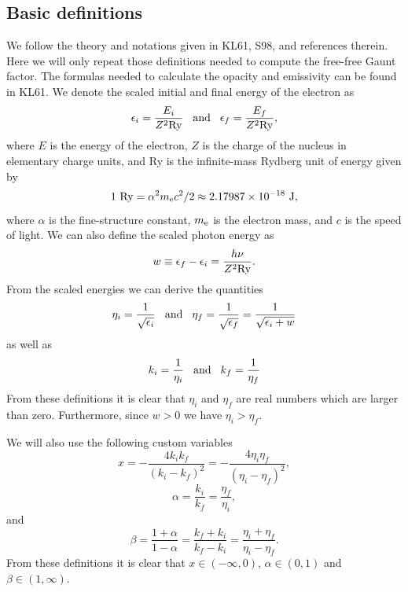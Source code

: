 \documentclass[useAMS,usenatbib]{mn2e}
\begin{document}
\subsection{Basic definitions}

We follow the theory and notations given in KL61, S98, and references therein.
Here we will only repeat those definitions needed to compute the free-free
Gaunt factor. The formulas needed to calculate the opacity and emissivity can
be found in KL61. We denote the scaled initial and final energy of the
electron as
\begin{equation}
\epsilon_i = \frac{E_i}{Z^2 {\rm Ry}} \hspace{3mm} {\rm and} \hspace{3mm} \epsilon_f = \frac{E_f}{Z^2 {\rm Ry}},
\end{equation}
where $E$ is the energy of the electron, $Z$ is the charge of the nucleus in
elementary charge units, and Ry is the infinite-mass Rydberg unit of energy
given by
\[ 1~{\rm Ry} = \alpha^2 m_{\rm e} c^2 / 2 \approx 2.17987\times10^{-18}~\rm{J}, \]
where $\alpha$ is the fine-structure constant, $m_{\rm e}$ is the electron mass, and
$c$ is the speed of light. We can also define the scaled photon energy as
\begin{equation}
w \equiv \epsilon_f - \epsilon_i = \frac{h\nu}{Z^2 {\rm Ry}}.
\end{equation}
From the scaled energies we can derive the quantities
\begin{equation}
\label{eps}
\eta_i = \frac{1}{\sqrt{\epsilon_i}}  \hspace{3mm} {\rm and} \hspace{3mm} 
\eta_f = \frac{1}{\sqrt{\epsilon_f}} = \frac{1}{\sqrt{\epsilon_i+w}}
\end{equation}
as well as
\begin{equation}
k_i = \frac{1}{\eta_i} \hspace{3mm} {\rm and} \hspace{3mm} k_f = \frac{1}{\eta_f}
\end{equation}
From these definitions it is clear that $\eta_i$ and $\eta_f$ are real numbers
which are larger than zero. Furthermore, since $w > 0$ we have $\eta_i >
\eta_f$.

We will also use the following custom variables
\begin{equation}
  x = -\frac{4k_ik_f}{(k_i-k_f)^2} = -\frac{4\eta_i\eta_f}{(\eta_i-\eta_f)^2},
\end{equation}
\begin{equation}
  \alpha = \frac{k_i}{k_f} = \frac{\eta_f}{\eta_i},
\end{equation}
and
\begin{equation}
  \beta = \frac{1+\alpha}{1-\alpha} = \frac{k_f+k_i}{k_f-k_i} = \frac{\eta_i+\eta_f}{\eta_i-\eta_f}.
\end{equation}
From these definitions it is clear that $x \in (-\infty,0)$, $\alpha \in
(0,1)$ and $\beta \in (1,\infty)$.
\end{document}

